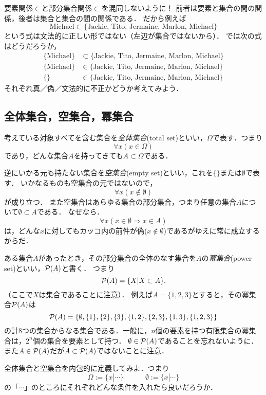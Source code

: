 \documentclass[11pt,a4paper]{jsarticle}
\begin{document}
\begin{attn}
要素関係$\in$と部分集合関係$\subset$を混同しないように！
前者は要素と集合の間の関係，後者は集合と集合の間の関係である．
だから例えば
\[
\text{Michael} \subset \{ \text{Jackie, Tito, Jermaine, Marlon, Michael}\}  
\]
という式は文法的に正しい形ではない（左辺が集合ではないから）．
では次の式はどうだろうか，
\begin{align*}
\{ \text{Michael} \} &\subset \{ \text{Jackie, Tito, Jermaine, Marlon, Michael}\}  \\
\{ \text{Michael} \} &\in \{ \text{Jackie, Tito, Jermaine, Marlon, Michael}\}  \\
\{  \} &\in \{ \text{Jackie, Tito, Jermaine, Marlon, Michael}\}  
\end{align*}
それぞれ真／偽／文法的に不正かどうか考えてみよう．
\end{attn}

\subsection{全体集合，空集合，冪集合}
考えている対象すべてを含む集合を\emph{全体集合}(total set)といい，$\Omega$で表す．つまり
\[
\forall x (x \in \Omega)
\]
であり，どんな集合$A$を持ってきても$A \subset \Omega$である．

逆にいかる元も持たない集合を\emph{空集合}(empty set)といい，これを$\{\}$または$\emptyset$で表す．
いかなるものも空集合の元ではないので，
\[
\forall x (x \not\in \emptyset)
\]
が成り立つ．
また空集合はあらゆる集合の部分集合，つまり任意の集合$A$について$\emptyset \subset A$である．
なぜなら．
\[
\forall x (x \in \emptyset \Rightarrow x \in A)
\]
は，どんな$x$に対してもカッコ内の前件が偽($x \not\in \emptyset$)であるがゆえに常に成立するからだ．

ある集合$A$があったとき，その部分集合の全体のなす集合を$A$の\emph{冪集合}(power set)といい，$\mathcal{P}(A)$と書く．
つまり
\[
 \mathcal{P}(A) = \{ X| X \subset A \}.
\]
（ここで$X$は集合であることに注意）．
例えば$A = \{1, 2, 3\}$とすると，その冪集合$\mathcal{P}(A)$は
\[
 \mathcal{P}(A) = \{ \emptyset, \{1\}, \{2\}, \{3\}, \{1,2\}, \{2,3\}, \{1,3\}, \{1,2,3\} \}
\]
の計8つの集合からなる集合である．一般に，$n$個の要素を持つ有限集合の冪集合は，$2^n$個の集合を要素として持つ．
$\emptyset \in \mathcal{P}(A)$であることを忘れないように．
また$A \in \mathcal{P}(A)$だが$A \subset \mathcal{P}(A)$ではないことに注意．



\begin{exercise}
全体集合と空集合を内包的に定義してみよ．つまり
\[
\Omega := \{ x | \cdots \}  \hspace{3em} \emptyset := \{ x | \cdots \}
\]
の「$\cdots$」のところにそれぞれどんな条件を入れたら良いだろうか． 
\end{exercise}
\end{document}
